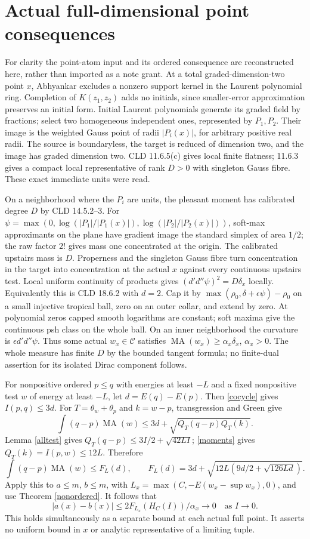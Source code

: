 \documentclass[11pt]{article}
\newcommand{\DD}{d'd''}
\newcommand{\MA}{\operatorname{MA}}
\newcommand{\C}{\mathcal C}
\theoremstyle{remark}\newtheorem{remark}[theorem]{Remark}
\begin{document}
\section{Actual full-dimensional point consequences}
For clarity the point-atom input and its ordered consequence are
reconstructed here, rather than imported as a note grant.
At a total graded-dimension-two point $x$, Abhyankar excludes a
nonzero support kernel in the Laurent polynomial ring. Completion of
$K(z_1,z_2)$ adds no initials, since smaller-error approximation
preserves an initial form. Initial Laurent polynomials generate its
graded field by fractions; select two homogeneous independent ones,
represented by $P_1,P_2$. Their image is the weighted Gauss point of
radii $|P_i(x)|$, for arbitrary positive real radii. The source is
boundaryless, the target is reduced of dimension two, and the image
has graded dimension two. CLD 11.6.5(c) gives local finite flatness;
11.6.3 gives a compact local representative of rank $D>0$ with
singleton Gauss fibre. These exact immediate units were read.

On a neighborhood where the $P_i$ are units, the pleasant moment
has calibrated degree $D$ by CLD 14.5.2--3. For
$\psi=\max(0,\log(|P_1|/|P_1(x)|),\log(|P_2|/|P_2(x)|))$,
soft-max approximants on the plane have gradient image the standard
simplex of area $1/2$; the raw factor $2!$ gives mass one concentrated
at the origin. The calibrated upstairs mass is $D$. Properness and
the singleton Gauss fibre turn concentration in the target into
concentration at the actual $x$ against every continuous upstairs
test. Local uniform continuity of products gives $(\DD\psi)^2=D\delta_x$
locally. Equivalently this is CLD 18.6.2 with $d=2$.
Cap it by $\max(\rho_0,\delta+\epsilon\psi)-\rho_0$ on a small
injective tropical ball, zero on an outer collar, and extend by zero.
At polynomial zeros capped smooth logarithms are constant; soft
maxima give the continuous psh class on the whole ball. On an inner
neighborhood the curvature is $\epsilon\DD\psi$. Thus some actual
$w_x\in\C$ satisfies $\MA(w_x)\ge\alpha_x\delta_x$, $\alpha_x>0$.
The whole measure has finite $D$ by the bounded tangent formula;
no finite-dual assertion for its isolated Dirac component follows.

For nonpositive ordered $p\le q$ with energies at least $-L$ and a
fixed nonpositive test $w$ of energy at least $-L$, let
$d=E(q)-E(p)$. Then \eqref{cocycle} gives $I(p,q)\le3d$.
For $T=\theta_w+\theta_p$ and $k=w-p$, transgression and Green give
\[
 \int(q-p)\MA(w)\le3d+\sqrt{Q_T(q-p)Q_T(k)}.
\]
Lemma \ref{alltest} gives $Q_T(q-p)\le3I/2+\sqrt{42LI}$;
\eqref{moments} gives $Q_T(k)=I(p,w)\le12L$. Therefore
\[
 \int(q-p)\MA(w)\le F_L(d),\qquad
 F_L(d)=3d+\sqrt{12L(9d/2+\sqrt{126Ld})}.
\]
Apply this to $a\le m$, $b\le m$, with
$L_x=\max(C,-E(w_x-\sup w_x),0)$, and use
Theorem \ref{nonordered}. It follows that
\begin{equation}\label{point}
 |a(x)-b(x)|\le 2F_{L_x}(H_C(I))/\alpha_x\longrightarrow0
 \quad\text{as }I\to0.
\end{equation}
This holds simultaneously as a separate bound at each actual full
point. It asserts no uniform bound in $x$ or analytic representative
of a limiting tuple.
\end{document}
